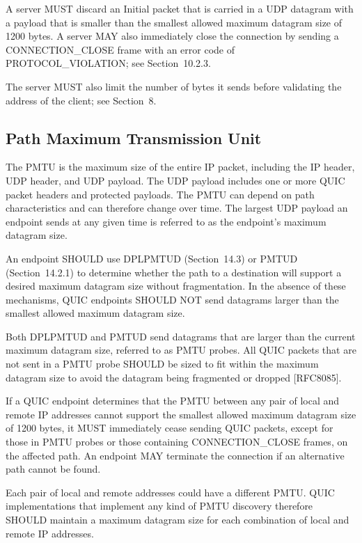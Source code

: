 \documentclass{article}
\begin{document}
A server MUST discard an Initial packet that is carried in a UDP datagram with a payload that is smaller than the smallest allowed maximum datagram size of 1200 bytes.  A server MAY also immediately close the connection by sending a CONNECTION\_CLOSE frame with an error code of PROTOCOL\_VIOLATION; see Section~10.2.3.

The server MUST also limit the number of bytes it sends before validating the address of the client; see Section~8.

\subsection{Path Maximum Transmission Unit}

The PMTU is the maximum size of the entire IP packet, including the IP header, UDP header, and UDP payload.  The UDP payload includes one or more QUIC packet headers and protected payloads.  The PMTU can depend on path characteristics and can therefore change over time. The largest UDP payload an endpoint sends at any given time is referred to as the endpoint's maximum datagram size.

An endpoint SHOULD use DPLPMTUD (Section~14.3) or PMTUD (Section~14.2.1) to determine whether the path to a destination will support a desired maximum datagram size without fragmentation.  In the absence of these mechanisms, QUIC endpoints SHOULD NOT send datagrams larger than the smallest allowed maximum datagram size.

Both DPLPMTUD and PMTUD send datagrams that are larger than the current maximum datagram size, referred to as PMTU probes.  All QUIC packets that are not sent in a PMTU probe SHOULD be sized to fit within the maximum datagram size to avoid the datagram being fragmented or dropped [RFC8085].

If a QUIC endpoint determines that the PMTU between any pair of local and remote IP addresses cannot support the smallest allowed maximum datagram size of 1200 bytes, it MUST immediately cease sending QUIC packets, except for those in PMTU probes or those containing CONNECTION\_CLOSE frames, on the affected path.  An endpoint MAY terminate the connection if an alternative path cannot be found.

Each pair of local and remote addresses could have a different PMTU. QUIC implementations that implement any kind of PMTU discovery therefore SHOULD maintain a maximum datagram size for each combination of local and remote IP addresses.
\end{document}
